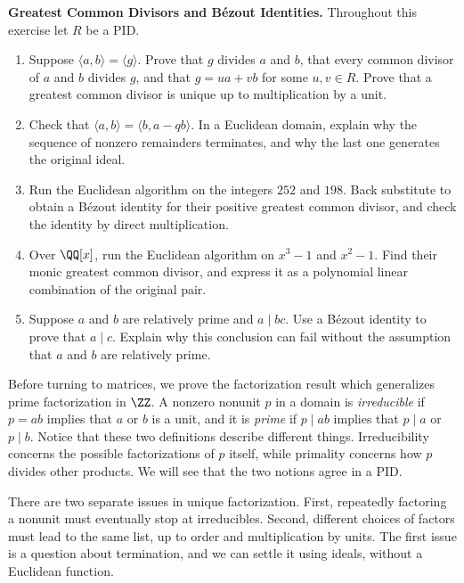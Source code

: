 \documentclass[12pt,reqno]{amsart}
\begin{document}
\begin{problems}
\item\label{s:bezout} \textbf{Greatest Common Divisors and B\'ezout Identities.} Throughout this exercise let $R$ be a PID.
\begin{enumerate}
\item Suppose $\langle a,b\rangle=\langle g\rangle$. Prove that $g$ divides $a$ and $b$, that every common divisor of $a$ and $b$ divides $g$, and that $g=ua+vb$ for some $u,v\in R$. Prove that a greatest common divisor is unique up to multiplication by a unit.
\item Check that $\langle a,b\rangle=\langle b,a-qb\rangle$. In a Euclidean domain, explain why the sequence of nonzero remainders terminates, and why the last one generates the original ideal.
\item Run the Euclidean algorithm on the integers $252$ and $198$. Back substitute to obtain a B\'ezout identity for their positive greatest common divisor, and check the identity by direct multiplication.
\item Over $\QQ[x]$, run the Euclidean algorithm on $x^3-1$ and $x^2-1$. Find their monic greatest common divisor, and express it as a polynomial linear combination of the original pair.
\item Suppose $a$ and $b$ are relatively prime and $a\mid bc$. Use a B\'ezout identity to prove that $a\mid c$. Explain why this conclusion can fail without the assumption that $a$ and $b$ are relatively prime.
\end{enumerate}
\end{problems}

\hrulefill

Before turning to matrices, we prove the factorization result which generalizes prime factorization in $\ZZ$. A nonzero nonunit $p$ in a domain is \emph{irreducible} if $p=ab$ implies that $a$ or $b$ is a unit, and it is \emph{prime} if $p\mid ab$ implies that $p\mid a$ or $p\mid b$. Notice that these two definitions describe different things. Irreducibility concerns the possible factorizations of $p$ itself, while primality concerns how $p$ divides other products. We will see that the two notions agree in a PID.

There are two separate issues in unique factorization. First, repeatedly factoring a nonunit must eventually stop at irreducibles. Second, different choices of factors must lead to the same list, up to order and multiplication by units. The first issue is a question about termination, and we can settle it using ideals, without a Euclidean function.
\end{document}
